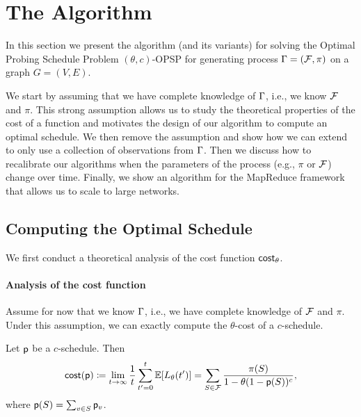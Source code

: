 \section{The \algonamebasecaps{} Algorithm}\label{sec:method}
In this section we present the algorithm \algoname
(and its variants) for solving 
the Optimal Probing Schedule Problem $(\theta,c)$-OPSP for generating process
$\Gamma=(\mathcal{F},\pi)$ on a graph $G=(V,E)$. 

We start by assuming that we have complete knowledge of $\Gamma$, i.e., we know
$\mathcal{F}$ and $\pi$. This strong assumption allows us to study the theoretical
properties of the cost of a function and motivates the design of our algorithm
\algoname to compute an optimal schedule. We then remove the assumption and show
how we can extend \algoname to only use a collection of observations from
$\Gamma$. Then we discuss how to recalibrate our algorithms when the parameters of
the process (e.g., $\pi$ or $\mathcal{F}$) change over time.  Finally, we show an
algorithm for the MapReduce framework that allows us to scale to large networks.

\subsection{Computing the Optimal Schedule}\label{sec:optimize}
We first conduct a theoretical analysis of the cost function $\mathsf{cost}_\theta$.

\paragraph{Analysis of the cost function}
Assume for now that we know $\Gamma$, i.e., we have complete knowledge of
$\mathcal{F}$ and $\pi$. Under this assumption, we can exactly compute the
$\theta$-cost of a $c$-schedule.

\begin{lemma}\label{lem:explicit}
Let $\mathsf{p}$ be a $c$-schedule. Then
\begin{equation}\label{eq:explicit}
	\mathsf{cost}(\mathsf{p}) \coloneqq
	\lim_{t\rightarrow\infty}\frac{1}{t}\sum_{t'=0}^t\mathbb{E}[L_\theta(t')] =
	\sum_{S\in \mathcal{F}} \frac{\pi(S)}{1- \theta(1-\mathsf{p}(S))^c},
\end{equation}
where $\mathsf{p}(S) = \sum_{v\in S} \mathsf{p}_v$.
\end{lemma}

